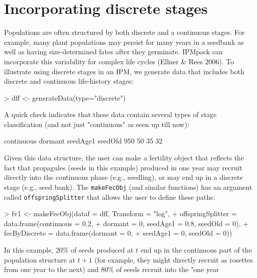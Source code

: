 \documentclass{article}
\begin{document}
\section{Incorporating discrete stages}
Populations are often structured by both discrete and a continuous stages.  For
example, many plant populations may persist for many years in a seedbank as well
as having size-determined fates after they germinate. IPMpack can incorporate
this variability for complex life cycles (Ellner \& Rees $2006$). To illustrate
using discrete stages in an IPM, we generate data that includes
both discrete and continuous life-history stages:
\begin{Schunk}
\begin{Sinput}
> dff <- generateData(type="discrete")
\end{Sinput}
\end{Schunk}
A quick check indicates that these data contain several types of stage classification (and not just "continuous" as seen up till now):
\begin{Schunk}
\begin{Soutput}
continuous    dormant   seedAge1    seedOld 
       950         50         35         32 
\end{Soutput}
\end{Schunk}
Given this data structure, the user can make a fertility object that reflects the
fact that propagules (seeds in this example) produced in one year may 
recruit directly into the continuous phase (e.g., seedling), or may end up in a
discrete stage (e.g., seed bank). The {\tt makeFecObj} (and similar functions)
has an argument called {\tt offspringSplitter} that allows the user to define
these paths:
\begin{Schunk}
\begin{Sinput}
> fv1 <- makeFecObj(dataf = dff, Transform = "log", 
+                   offspringSplitter = data.frame(continuous = 0.2, 
+                   dormant = 0, seedAge1 = 0.8, seedOld = 0), 
+                   fecByDiscrete = data.frame(dormant = 0, 
+                   seedAge1 = 0, seedOld = 0))
\end{Sinput}
\end{Schunk}
In this example, 20\% of seeds produced at $t$ end up in the continuous part of
the population structure at $t+1$ (for example, they might directly recruit as
rosettes from one year to the next) and 80\% of seeds recruit into the "one year
\end{document}
